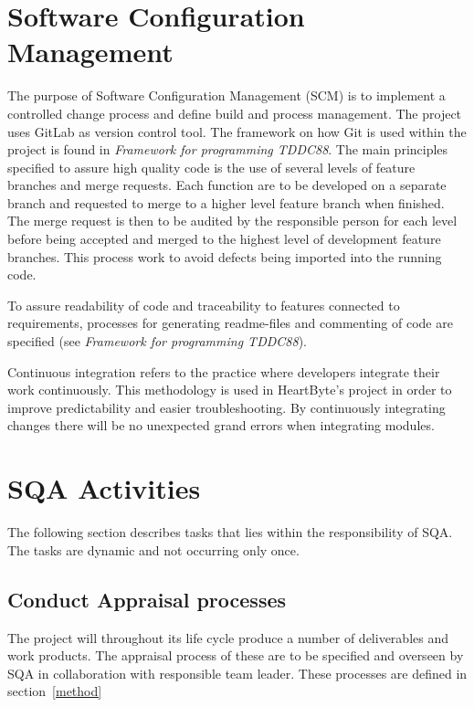 \documentclass{article}
\begin{document}
	\section{Software Configuration Management}
	The purpose of Software Configuration Management (SCM) is to implement a controlled change process and define build and process management. The project uses GitLab as version control tool. The framework on how Git is used within the project is found in \textit{Framework for programming TDDC88}. The main principles specified to assure high quality code is the use of several levels of feature branches and merge requests. Each function are to be developed on a separate branch and requested to merge to a higher level feature branch when finished. The merge request is then to be audited by the responsible person for each level before being accepted and merged to the highest level of development feature branches. This process work to avoid defects being imported into the running code.
	
	To assure readability of code and traceability to features connected to requirements, processes for generating readme-files and commenting of code are specified (see \textit{Framework for programming TDDC88}).
	
	Continuous integration refers to the practice where developers integrate their work continuously. This methodology is used in HeartByte's project in order to improve predictability and easier troubleshooting. By continuously integrating changes there will be no unexpected grand errors when integrating modules.

	\clearpage
	\section{SQA Activities}
	The following section describes tasks that lies within the responsibility of SQA. The tasks are dynamic and not occurring only once.  
	
	
	\subsection{Conduct Appraisal processes}
	The project will throughout its life cycle produce a number of deliverables and work products. The appraisal process of these are to be specified and overseen by SQA in collaboration with responsible team leader. These processes are defined in section~\ref{method} 
		
\end{document}
